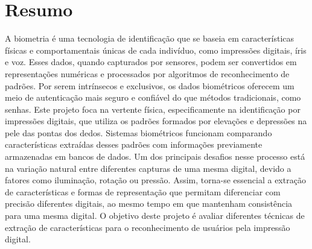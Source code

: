 \section*{Resumo}

A biometria é uma tecnologia de identificação que se baseia em características físicas e comportamentais únicas de cada indivíduo, como impressões digitais, íris e voz. Esses dados, quando capturados por sensores, podem ser convertidos em representações numéricas e processados por algoritmos de reconhecimento de padrões. Por serem intrínsecos e exclusivos, os dados biométricos oferecem um meio de autenticação mais seguro e confiável do que métodos tradicionais, como senhas. Este projeto foca na vertente física, especificamente na identificação por impressões digitais, que utiliza os padrões formados por elevações e depressões na pele das pontas dos dedos. Sistemas biométricos funcionam comparando características extraídas desses padrões com informações previamente armazenadas em bancos de dados. Um dos principais desafios nesse processo está na variação natural entre diferentes capturas de uma mesma digital, devido a fatores como iluminação, rotação ou pressão. Assim, torna-se essencial a extração de características e formas de representação que permitam diferenciar com precisão diferentes digitais, ao mesmo tempo em que mantenham consistência para uma mesma digital. O objetivo deste projeto é avaliar diferentes técnicas de extração de características para o reconhecimento de usuários pela impressão digital.
